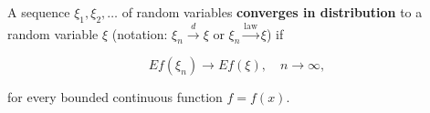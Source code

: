 A sequence $\xi_1, \xi_2, \ldots$ of random variables \textbf{converges in distribution} to a random variable $\xi$ (notation: $\xi_n \xrightarrow{d} \xi$ or $\xi_n \xrightarrow{\text{law}} \xi$) if

$$E f(\xi_n) \to E f(\xi), \quad n \to \infty,$$

for every bounded continuous function $f = f(x)$.
